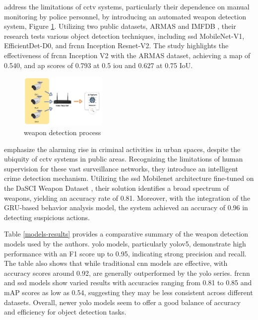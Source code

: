 \citet{rfc20} address the limitations of \ac{cctv} systems, particularly their dependence on manual monitoring by police personnel, by introducing an automated weapon detection system, Figure \ref{fig:hnoohom-system}. Utilizing two public datasets, ARMAS and IMFDB \cite{rfc28}, their research tests various object detection techniques, including \ac{ssd} MobileNet-V1, EfficientDet-D0, and \ac{frcnn} Inception Resnet-V2. The study highlights the effectiveness of \ac{frcnn} Inception V2 with the ARMAS dataset, achieving a \ac{map} of 0.540, and \ac{ap} scores of 0.793 at 0.5 \ac{iou} and 0.627 at 0.75 IoU.
\begin{figure}[h]
    \centering 
    \includegraphics[width=0.37\textwidth]{figs/hnoohom-system.png} 
    \caption{\citet{rfc20} weapon detection process}
    \label{fig:hnoohom-system}
\end{figure}

\citet{rfc7} emphasize the alarming rise in criminal activities in urban spaces, despite the ubiquity of \ac{cctv} systems in public areas. Recognizing the limitations of human supervision for these vast surveillance networks, they introduce an intelligent crime detection mechanism. Utilizing the \ac{ssd} Mobilenet architecture fine-tuned on the DaSCI Weapon Dataset \cite{rfc29}, their solution identifies a broad spectrum of weapons, yielding an accuracy rate of 0.81. Moreover, with the integration of the GRU-based behavior analysis model, the system achieved an accuracy of 0.96 in detecting suspicious actions.

Table \ref{models-results} provides a comparative summary of the weapon detection models used by the authors. \ac{yolo} models, particularly \ac{yolo}v5, demonstrate high performance with an F1 score up to 0.95, indicating strong precision and recall. The table also shows that while traditional \ac{cnn} models are effective, with accuracy scores around 0.92, are generally outperformed by the \ac{yolo} series. \ac{frcnn} and \ac{ssd} models show varied results with accuracies ranging from 0.81 to 0.85 and mAP scores as low as 0.54, suggesting they may be less consistent across different datasets. Overall, newer \ac{yolo} models seem to offer a good balance of accuracy and efficiency for object detection tasks.

